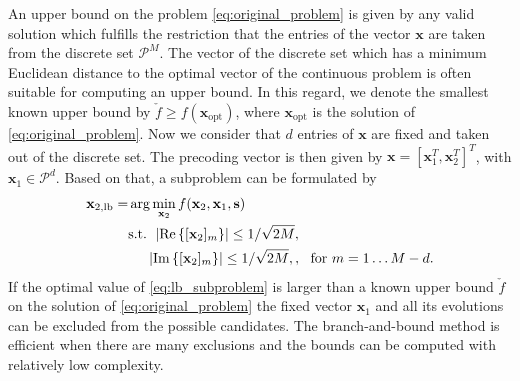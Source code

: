 \documentclass[journal,comsoc]{IEEEtran}
\begin{document}
An upper bound on the problem \eqref{eq:original_problem} is given by any valid solution which fulfills the restriction that the entries of the vector $\mathbf{x}$ are taken from the discrete set $\mathcal{P}^{M}$. The vector of the discrete set which has a minimum Euclidean distance to the optimal vector of the continuous problem is often suitable for computing an upper bound. In this regard, we denote the smallest known upper bound by $\check{ f } \geq  f(\mathbf{x}_{\textrm{opt}})$, where $\mathbf{x}_{\textrm{opt}}$ is the solution of \eqref{eq:original_problem}.
Now we consider that $d$ entries of $\mathbf{x}$ are fixed and taken out of the discrete set.
The precoding vector is then given by $\mathbf{x}=[\mathbf{x}_1^T, \mathbf{x}_2^T ]^T$, with $\mathbf{x}_1 \in \mathcal{P}^d $.
Based on that, a subproblem can be formulated by
\begin{align}
\label{eq:lb_subproblem}
\mathbf{x}_{2,\textrm{lb}} =& \arg\min_{\mathbf{x}_2} f(\mathbf{x}_2, \mathbf{x}_1, \mathbf{s} ) \\
&\textrm{s.t. }   \left| \mathrm{Re} \left\{   [\mathbf{x}_2]_m  \right\}\right| \leq  1/\sqrt{2M},     \notag \\
& \ \ \ \   \left| \mathrm{Im} \left\{   [\mathbf{x}_2]_m  \right\}\right| \leq  1/\sqrt{2M}, , \ \   \textrm{for }m=1\ldots{M-d}\textrm{.}  \notag  
 \end{align}
If the optimal value of \eqref{eq:lb_subproblem} is larger than a known upper bound $\check{ f }$ on the solution of \eqref{eq:original_problem} the fixed vector $\mathbf{x}_{1}$ and all its evolutions can be excluded from the possible candidates. The branch-and-bound method is efficient when there are many exclusions and the bounds can be computed with relatively low complexity. 
\end{document}
